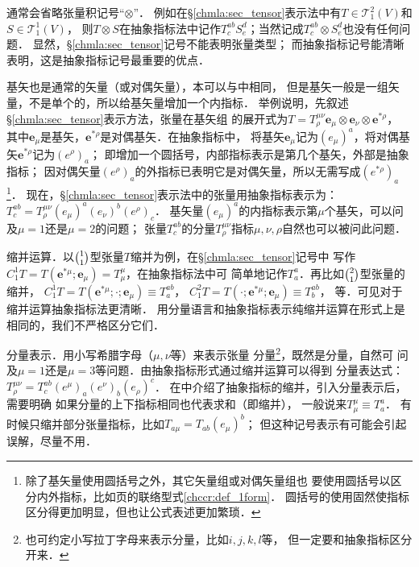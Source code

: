  通常会省略张量积记号“$\otimes$”．
例如在\S \ref{chmla:sec_tensor}表示法中有$T\in \mathcal{T}^{2}_{1}(V)$和$S\in \mathcal{T}^{1}_{1}(V)$，
则$T\otimes S$在抽象指标法中记作$T^{ab}_c S^d_e$；当然记成$T^{ab}_c\otimes S^d_e$也没有任何问题．
显然，\S \ref{chmla:sec_tensor}记号{\heiti 不能}表明张量类型；
而抽象指标记号{\heiti 能}清晰表明，这是抽象指标记号最重要的优点．


 基矢也是通常的矢量（或对偶矢量），本可以与中相同，
但是基矢一般是一组矢量，不是单个的，所以给基矢量增加一个内指标．
举例说明，先叙述\S \ref{chmla:sec_tensor}表示方法，张量在基矢组
的展开式为$T=T^{\mu\nu}_{\rho} \boldsymbol{e}_\mu \otimes \boldsymbol{e}_\nu \otimes \boldsymbol{e}^{*\rho}$，
其中$\boldsymbol{e}_\mu$是基矢，$\boldsymbol{e}^{*\rho}$是对偶基矢．在抽象指标中，
将基矢$\boldsymbol{e}_\mu$记为$(e_\mu)^a$，将对偶基矢$\boldsymbol{e}^{*\rho }$记为$(e^{\rho})_a$；
即增加一个圆括号，内部指标表示是第几个基矢，外部是抽象指标；
因对偶矢量$(e^{\rho})_a$的外指标已表明它是对偶矢量，所以无需写成$(e^{*\rho})_a$
{\footnote{除了基矢量使用圆括号之外，其它矢量{\kaishu 组}或对偶矢量{\kaishu 组}也
        要使用圆括号以区分内外指标，比如\pageref{chccr:def_1form}页的联络型式\eqref{chccr:def_1form}．
        圆括号的使用固然使指标区分得更加明显，但也让公式表述更加繁琐．}}．
现在，\S \ref{chmla:sec_tensor}表示法中的张量用抽象指标表示为：
$    T^{ab}_c = T^{\mu\nu}_{\rho} (e_\mu)^a (e_\nu)^b (e^{\rho})_c $．
基矢量$(e_\mu)^a$的内指标表示第$\mu$个基矢，可以问及$\mu=1$还是$\mu=2$的问题；
张量$T^{ab}_c$的分量$T^{\mu\nu}_{\rho}$指标$\mu,\nu,\rho$自然也可以被问此问题．

 缩并运算．以$\binom{1}{1}$型张量$T$缩并为例，在\S\ref{chmla:sec_tensor}记号中
写作$C^1_1 T=T(\boldsymbol{e}^{*\mu};\boldsymbol{e}_\mu)=T^\mu _\mu$，在抽象指标法中可
简单地记作$T^a_{a}$．再比如$\binom{2}{1}$型张量的缩并，
$C^1_1 T=T(\boldsymbol{e}^{*\mu};\cdot;\boldsymbol{e}_\mu)\equiv T^{ab}_a$，
$C^2_1 T=T(\cdot;\boldsymbol{e}^{*\mu};\boldsymbol{e}_\mu)\equiv T^{ab}_b$，
等．可见对于缩并运算抽象指标法更清晰．
用分量语言和抽象指标表示纯缩并运算在形式上是相同的，我们不严格区分它们．

 分量表示．用小写希腊字母（$\mu,\nu$等）来表示张量
分量{\footnote{也可约定小写拉丁字母来表示分量，比如$i,j,k,l$等，
        但一定要和抽象指标区分开来．}}，既然是分量，自然可
问及$\mu=1$还是$\mu=3$等问题．由抽象指标形式通过缩并运算可以得到
分量表达式：
$    T^{\mu\nu}_{\rho} = T^{ab}_c (e^\mu)_a (e^\nu)_b (e_{\rho})^c $．
在中介绍了抽象指标的缩并，引入分量表示后，需要明确
如果分量的上下指标相同也代表求和（即缩并），
一般说来$T^\mu _\mu \equiv T^a _a$．
有时候只缩并部分张量指标，比如$T_{a\mu}=T_{ab}(e_\mu)^b$；
但这种记号表示有可能会引起误解，尽量不用．


